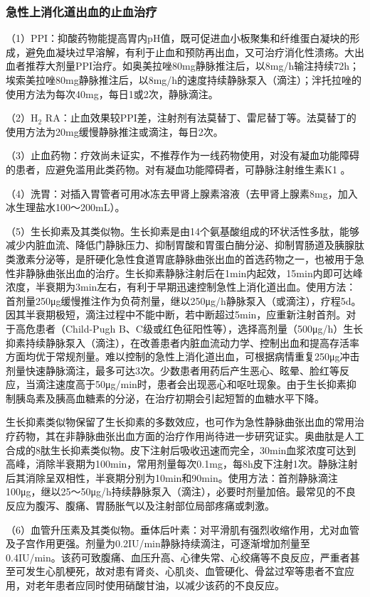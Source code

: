 \subsubsection{急性上消化道出血的止血治疗}

（1）PPI：抑酸药物能提高胃内pH值，既可促进血小板聚集和纤维蛋白凝块的形成，避免血凝块过早溶解，有利于止血和预防再出血，又可治疗消化性溃疡。大出血者推荐大剂量PPI治疗。如奥美拉唑80mg静脉推注后，以8mg/h输注持续72h；埃索美拉唑80mg静脉推注后，以8mg/h的速度持续静脉泵入（滴注）；泮托拉唑的使用方法为每次40mg，每日1或2次，静脉滴注。

（2）H$_2$
RA：止血效果较PPI差，注射剂有法莫替丁、雷尼替丁等。法莫替丁的使用方法为20mg缓慢静脉推注或滴注，每日2次。

（3）止血药物：疗效尚未证实，不推荐作为一线药物使用，对没有凝血功能障碍的患者，应避免滥用此类药物。对有凝血功能障碍者，可静脉注射维生素K{1}
。

（4）洗胃：对插入胃管者可用冰冻去甲肾上腺素溶液（去甲肾上腺素8mg，加入冰生理盐水100～200mL）。

（5）生长抑素及其类似物。生长抑素是由14个氨基酸组成的环状活性多肽，能够减少内脏血流、降低门静脉压力、抑制胃酸和胃蛋白酶分泌、抑制胃肠道及胰腺肽类激素分泌等，是肝硬化急性食道胃底静脉曲张出血的首选药物之一，也被用于急性非静脉曲张出血的治疗。生长抑素静脉注射后在1min内起效，15min内即可达峰浓度，半衰期为3min左右，有利于早期迅速控制急性上消化道出血。使用方法：首剂量250μg缓慢推注作为负荷剂量，继以250μg/h静脉泵入（或滴注），疗程5d。因其半衰期极短，滴注过程中不能中断，若中断超过5min，应重新注射首剂。对于高危患者（Child-Pugh
B、C级或红色征阳性等），选择高剂量（500μg/h）生长抑素持续静脉泵入（滴注），在改善患者内脏血流动力学、控制出血和提高存活率方面均优于常规剂量。难以控制的急性上消化道出血，可根据病情重复250μg冲击剂量快速静脉滴注，最多可达3次。少数患者用药后产生恶心、眩晕、脸红等反应，当滴注速度高于50μg/min时，患者会出现恶心和呕吐现象。由于生长抑素抑制胰岛素及胰高血糖素的分泌，在治疗初期会引起短暂的血糖水平下降。

生长抑素类似物保留了生长抑素的多数效应，也可作为急性静脉曲张出血的常用治疗药物，其在非静脉曲张出血方面的治疗作用尚待进一步研究证实。奥曲肽是人工合成的8肽生长抑素类似物。皮下注射后吸收迅速而完全，30min血浆浓度可达到高峰，消除半衰期为100min，常用剂量每次0.1mg，每8h皮下注射1次。静脉注射后其消除呈双相性，半衰期分别为10min和90min。使用方法：首剂静脉滴注100μg，继以25～50μg/h持续静脉泵入（滴注），必要时剂量加倍。最常见的不良反应为腹泻、腹痛、胃肠胀气以及注射部位局部疼痛或刺激。

（6）血管升压素及其类似物。垂体后叶素：对平滑肌有强烈收缩作用，尤对血管及子宫作用更强。剂量为0.2IU/min静脉持续滴注，可逐渐增加剂量至0.4IU/min。该药可致腹痛、血压升高、心律失常、心绞痛等不良反应，严重者甚至可发生心肌梗死，故对患有肾炎、心肌炎、血管硬化、骨盆过窄等患者不宜应用，对老年患者应同时使用硝酸甘油，以减少该药的不良反应。

